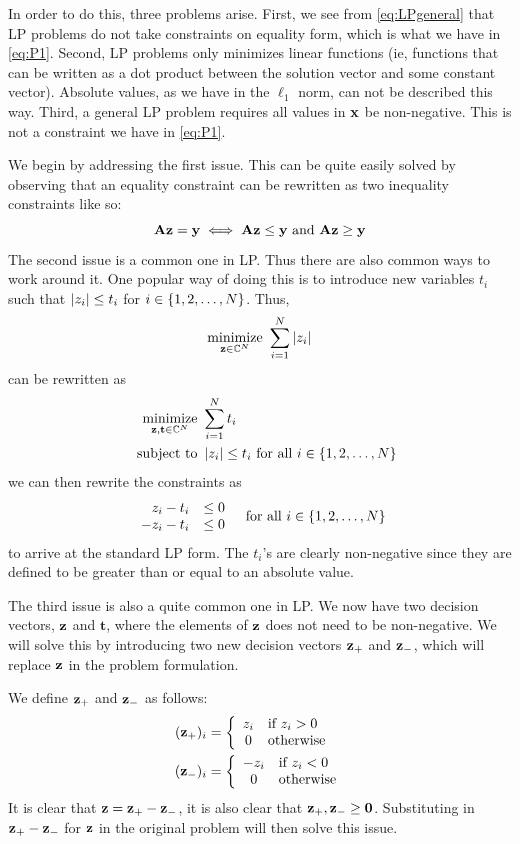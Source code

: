 In order to do this, three problems arise. First, we see from \cref{eq:LPgeneral} that LP problems do not take constraints on equality form, which is what we have in \eqref{eq:P1}. Second, LP problems only minimizes linear functions (ie, functions that can be written as a dot product between the solution vector and some constant vector). Absolute values, as we have in the $ \ell_{1} $ norm, can not be described this way. Third, a general LP problem requires all values in $ \mathbf{x} $ be non-negative. This is not a constraint we have in \eqref{eq:P1}.

We begin by addressing the first issue. This can be quite easily solved by observing that an equality constraint can be rewritten as two inequality constraints like so:
\[
	\mathbf{A}\mathbf{z} = \mathbf{y} \iff \mathbf{A}\mathbf{z} \leq \mathbf{y} \text{ and } \mathbf{A}\mathbf{z} \geq \mathbf{y}
\]
The second issue is a common one in LP. Thus there are also common ways to work around it. One popular way of doing this is to introduce new variables $ t_{i} $  such that $ \left|z_{i}\right| \leq t_{i} $ for $ i \in \{1, 2, \ldots, N\} $. Thus, 
\[ 
	\underset{\mathbf{z}\in\mathbb{C}^{N}}{\text{minimize}}~ \sum_{i=1}^{N} \left|z_{i}\right|
\]
can be rewritten as
\begin{align*}
	\underset{\mathbf{z},\mathbf{t} \in \mathbb{C}^{N}}{\text{minimize}}~ & \sum_{i=1}^{N}t_{i} \\
	\quad\operatorname*{subject~to}~ & \left|z_{i}\right| \leq t_{i} \text{ for all } i \in \{1, 2, \ldots, N\}
\end{align*}
we can then rewrite the constraints as
\[
	\begin{array}{r l}
		z_{i} - t_{i} & \leq 0\\
		- z_{i} - t_{i} & \leq 0
	\end{array}
	\quad\text{for all } i \in \{1, 2, \ldots, N\}
\]
to arrive at the standard LP form. The $ t_{i} $'s are clearly non-negative since they are defined to be greater than or equal to an absolute value. 

The third issue is also a quite common one in LP. We now have two decision vectors, $ \mathbf{z}  $ and $ \mathbf{t} $, where the elements of $ \mathbf{z} $ does not need to be non-negative. We will solve this by introducing two new decision vectors $ \mathbf{z}_{+} $ and $ \mathbf{z}_{-} $, which will replace $ \mathbf{z} $ in the problem formulation. 

We define $ \mathbf{z}_{+} $ and $ \mathbf{z}_{-} $ as follows:
\begin{align*}
	(\mathbf{z}_{+})_{i} &= \left\{ \begin{array}{cl} z_{i} & \text{if } z_{i} > 0 \\ 0 & \text{otherwise} \end{array} \right. \\
	(\mathbf{z}_{-})_{i} &= \left\{ \begin{array}{cl} -z_{i} & \text{if } z_{i} < 0 \\ 0 & \text{otherwise} \end{array} \right.
\end{align*}
It is clear that $ \mathbf{z} = \mathbf{z}_{+} - \mathbf{z}_{-} $, it is also clear that $ \mathbf{z}_{+}, \mathbf{z}_{-} \geq \mathbf{0} $. Substituting in $ \mathbf{z}_{+} - \mathbf{z}_{-} $ for $ \mathbf{z} $ in the original problem will then solve this issue. 

